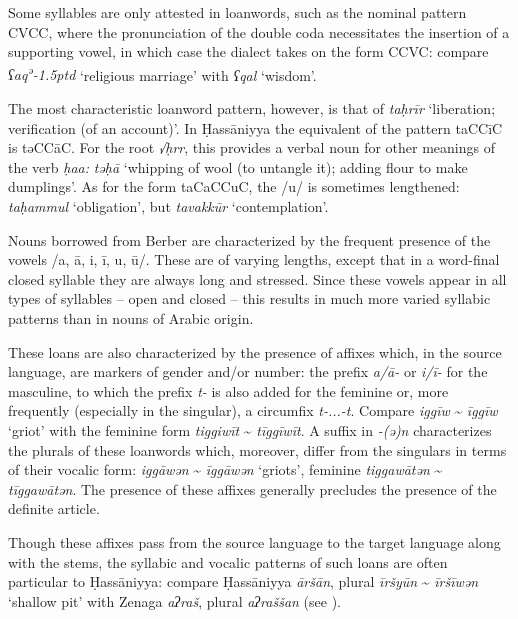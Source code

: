 \documentclass[output=paper]{langsci/langscibook}
\begin{document}
Some syllables are only attested in loanwords, such as the nominal pattern CVCC, where the pronunciation of the double coda necessitates the insertion of a supporting vowel, in which case the dialect takes on the form CCVC: compare \textit{ʕaq\kern 0.5pt\textsuperscript{ə}\kern -1.5ptd} ‘religious marriage’ with \textit{ʕqal} ‘wisdom’.

The most characteristic loanword pattern, however, is that of \textit{taḥrīr} ‘liberation; verification (of an account)’. In Ḥassāniyya the equivalent of the pattern taCCīC is təCCāC. For the root \textit{√ḥrr}, this provides a verbal noun for other meanings of the verb \textit{ḥa{\R}{\R}a{\R}:} \textit{təḥ{\R}ā{\R}} ‘whipping of wool (to untangle it); adding flour to make dumplings’. As for the form taCaCCuC, the /u/ is sometimes lengthened: \textit{taḥammul} ‘obligation’, but \textit{tavakkūr} ‘contemplation’.


Nouns borrowed from Berber are characterized by the frequent presence of the vowels /a, ā, i, ī, u, ū/. These are of varying lengths, except that in a word-final closed syllable they are always long and stressed. Since these vowels appear in all types of syllables – open and closed – this results in much more varied syllabic patterns than in nouns of Arabic origin. 

These loans are also characterized by the presence of affixes which, in the source language, are markers of gender and/or number: the prefix \textit{a/ā-} or \textit{i/ī-} for the masculine, to which the prefix \textit{t-} is also added for the feminine or, more frequently (especially in the singular), a circumfix \textit{t-...-t}. Compare \textit{iggīw} \~{} \textit{īggīw} ‘griot’ with the feminine form \textit{tiggiwīt} \~{} \textit{tīggīwīt}. A suffix in \textit{-(ə)n} characterizes the plurals of these loanwords which, moreover, differ from the singulars in terms of their vocalic form: \textit{iggāwən} \~{} \textit{īggāwən} ‘griots’, feminine \textit{tiggawātən} \~{} \textit{tīggawātən}. The presence of these affixes generally precludes the presence of the definite article.

Though these affixes pass from the source language to the target language along with the stems, the syllabic and vocalic patterns of such loans are often particular to Ḥassāniyya: compare Ḥassāniyya \textit{āršān}, plural \textit{īršyūn} \~{} \textit{īršīwən} ‘shallow pit’ with Zenaga \textit{aʔraš}, plural \textit{aʔraššan} (see \citealt{Taine-Cheikh1997Zenaga}).
\end{document}
